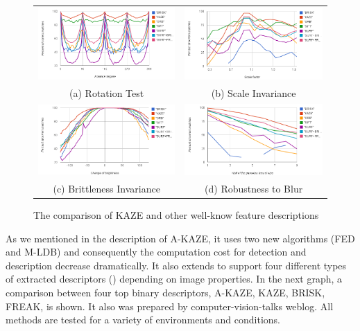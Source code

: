 \begin{figure}[H]
\begin{tabular}{cc}
  \includegraphics[width=75mm]{figures/rotation_KAZE} &  \includegraphics[width=75mm]{figures/scale_KAZE} \\
(a) Rotation Test & (b) Scale Invariance \\[6pt]
 \includegraphics[width=75mm]{figures/brightness_KAZE} &  \includegraphics[width=75mm]{figures/blur_KAZE} \\
(c) Brittleness Invariance & (d) Robustness to Blur \\[6pt]
\end{tabular}
\caption{The comparison of KAZE and other well-know feature descriptions}\label{fig:compare_kaze}
\end{figure}

As we mentioned in the description of A-KAZE, it uses two new algorithms (FED and M-LDB) and consequently the computation cost for detection and description decrease dramatically. It also extends to support four different types of extracted descriptors () depending on image properties. In the next graph, a comparison between four top binary descriptors, A-KAZE, KAZE, BRISK, FREAK, is shown. It also was prepared by computer-vision-talks weblog. All methods are tested for a variety of environments and conditions.


